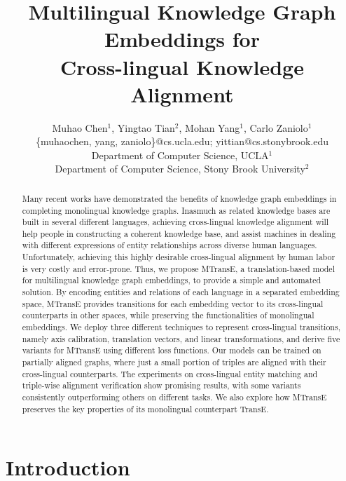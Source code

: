 \documentclass{article}
\begin{document}
\title{Multilingual Knowledge Graph Embeddings for\\ Cross-lingual Knowledge Alignment}


\author{Muhao Chen$^1$, Yingtao Tian$^2$, Mohan Yang$^1$, Carlo Zaniolo$^1$\\
\{muhaochen, yang, zaniolo\}@cs.ucla.edu; yittian@cs.stonybrook.edu\\
Department of Computer Science, UCLA$^1$\\
Department of Computer Science, Stony Brook University$^2$\\
}
\maketitle

\begin{abstract}


Many recent works have demonstrated the benefits of knowledge graph embeddings in completing monolingual knowledge graphs.
Inasmuch as related knowledge bases are built in several different languages, achieving cross-lingual knowledge alignment will help people in constructing a \mbox{coherent} knowledge base, and assist machines in dealing with different expressions of entity relationships across diverse human languages.
Unfortunately, achieving this highly desirable cross-lingual alignment
by human labor is very costly and error-prone.
Thus,
we propose MTransE, a translation-based model for multilingual knowledge graph embeddings, to provide a simple and automated solution.
By encoding
entities and relations of each language in a separated embedding space, MTransE
provides transitions for each
embedding vector to its cross-lingual counterparts in other spaces, while preserving the functionalities of monolingual embeddings.
We deploy three different techniques to represent cross-lingual transitions, namely axis calibration, translation vectors, and linear transformations, and derive five
variants for MTransE using
different loss functions.
Our models can be
trained on partially aligned graphs, where just a small portion of triples are aligned with their cross-lingual counterparts.
The experiments on cross-lingual entity matching and triple-wise alignment verification show promising results, with some variants consistently outperforming others on different tasks.
We also explore how MTransE preserves the key properties of its monolingual counterpart TransE.
\end{abstract}

\section{Introduction}
\end{document}
